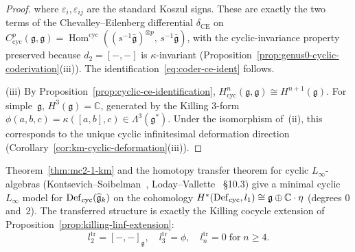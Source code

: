 \begin{proof}
where $\varepsilon_i, \varepsilon_{ij}$ are the standard Koszul signs.
These are exactly the two terms of the Chevalley--Eilenberg differential
$\delta_{\mathrm{CE}}$ on
$C^p_{\mathrm{cyc}}(\mathfrak{g},\mathfrak{g})
= \operatorname{Hom}^{\mathrm{cyc}}
((s^{-1}\bar{\mathfrak{g}})^{\otimes p},\,
s^{-1}\bar{\mathfrak{g}})$,
with the cyclic-invariance property preserved because $d_2 = [-,-]$
is $\kappa$-invariant (Proposition~\ref{prop:genus0-cyclic-coderivation}(iii)).
The identification~\eqref{eq:coder-ce-ident} follows.

(iii)\enspace
By Proposition~\ref{prop:cyclic-ce-identification},
$H^n_{\mathrm{cyc}}(\mathfrak{g},\mathfrak{g})
\cong H^{n+1}(\mathfrak{g})$.
For simple~$\mathfrak{g}$, $H^3(\mathfrak{g}) = \mathbb{C}$,
generated by the Killing $3$-form
$\phi(a,b,c) = \kappa([a,b],c) \in \Lambda^3(\mathfrak{g}^*)$.
Under the isomorphism of~(ii), this corresponds to the
unique cyclic infinitesimal deformation direction
(Corollary~\ref{cor:km-cyclic-deformation}(iii)).
\end{proof}

\begin{corollary}\label{cor:km-minimal-linf}
Theorem~\textup{\ref{thm:mc2-1-km}} and the homotopy transfer
theorem for cyclic $L_\infty$-algebras
\textup{(}Kontsevich--Soibelman~\textup{\cite{KontsevichSoibelman}},
Loday--Vallette~\textup{\cite{LV12}} \S10.3\textup{)}
give a minimal cyclic $L_\infty$ model for
$\operatorname{Def}_{\mathrm{cyc}}(\widehat{\mathfrak{g}}_k)$ on the cohomology
$H^*(\operatorname{Def}_{\mathrm{cyc}}, l_1) \cong \mathfrak{g} \oplus \mathbb{C}\cdot\eta$
\textup{(}degrees $0$ and~$2$\textup{)}.
The transferred structure is exactly
the Killing cocycle extension of
Proposition~\textup{\ref{prop:killing-linf-extension}}:
\begin{equation}\label{eq:km-minimal-linf-structure}
l_2^{\mathrm{tr}} = [-,-]_{\mathfrak{g}},\quad
l_3^{\mathrm{tr}} = \phi,\quad
l_n^{\mathrm{tr}} = 0 \;\text{for}\; n \geq 4.
\end{equation}
\end{corollary}

